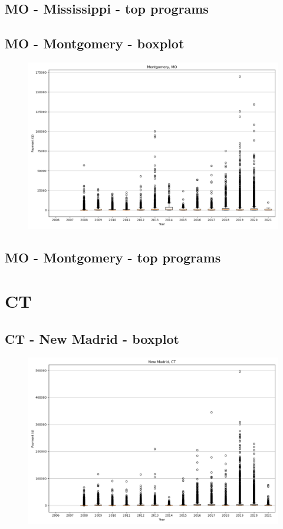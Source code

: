 \subsection*{MO - Mississippi - top programs}

\newpage
\subsection*{MO - Montgomery - boxplot}
\begin{figure}[h]
\centering
\includegraphics[width=7in]{../output/boxplots/counties/Montgomery-MO_boxplot.png}
\end{figure}


\subsection*{MO - Montgomery - top programs}

\newpage
\section*{CT}
\subsection*{CT - New Madrid - boxplot}
\begin{figure}[h]
\centering
\includegraphics[width=7in]{../output/boxplots/counties/New Madrid-CT_boxplot.png}
\end{figure}


